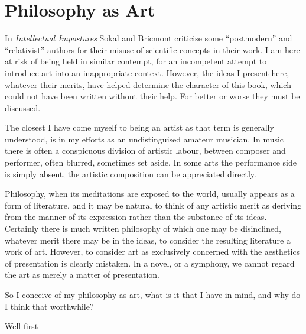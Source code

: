 
\def\wiki#1{#1\index{#1} \footnote{\href{http://wikipedia.org/wiki/#1}{http://wikpedia.org/wiki/#1}}}
\def\Wiki#1{\footnote{\href{http://wikipedia.org/wiki/#1}{http://wikpedia.org/wiki/#1}}}

\section{Philosophy as Art}

In {\it Intellectual Impostures} \cite{sokal1998} Sokal and Bricmont criticise some ``postmodern'' and ``relativist'' authors for their misuse of scientific concepts in their work.
I am here at risk of being held in similar contempt, for an incompetent attempt to introduce art into an inappropriate context.
However, the ideas I present here, whatever their merits, have helped determine the character of this book, which could not have been written without their help.
For better or worse they must be discussed.

The closest I have come myself to being an artist as that term is generally understood, is in my efforts as an undistinguised amateur musician.
In music there is often a conspicuous division of artistic labour, between composer and performer, often blurred, sometimes set aside.
In some arts the performance side is simply absent, the artistic composition can be appreciated directly.

Philosophy, when its meditations are exposed to the world, usually appears as a form of literature, and it may be natural to think of any artistic merit as deriving from the manner of its expression rather than the substance of its ideas.
Certainly there is much written philosophy of which one may be disinclined, whatever merit there may be in the ideas, to consider the resulting literature a work of art.
However, to consider art as exclusively concerned with the aesthetics of presentation is clearly mistaken.
In a novel, or a symphony, we cannot regard the art as merely a matter of presentation. 

So I conceive of my philosophy as art, what is it that I have in mind, and why do I think that worthwhile?

Well first 


